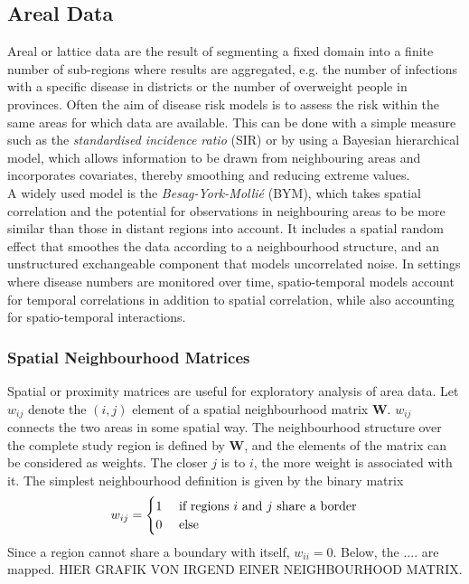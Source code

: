 \documentclass[12pt]{book}
\begin{document}
\subsection{Areal Data}
Areal or lattice data are the result of segmenting a fixed domain into a finite number of sub-regions where results are aggregated, e.g. the number of infections with a specific disease in districts or the number of overweight people in provinces. Often the aim of disease risk models is to assess the risk within the same areas for which data are available. This can be done with a simple measure such as the \textit{standardised incidence ratio} (SIR) or by using a Bayesian hierarchical model, which allows information to be drawn from neighbouring areas and incorporates covariates, thereby smoothing and reducing extreme values. \\
A widely used model is the \textit{Besag-York-Mollié} (BYM), which takes spatial correlation and the potential for observations in neighbouring areas to be more similar than those in distant regions into account. It includes a spatial random effect that smoothes the data according to a neighbourhood structure, and an unstructured exchangeable component that models uncorrelated noise. In settings where disease numbers are monitored over time, spatio-temporal models account for temporal correlations in addition to spatial correlation, while also accounting for spatio-temporal interactions.
\subsubsection{Spatial Neighbourhood Matrices}
Spatial or proximity matrices are useful for exploratory analysis of area data. Let $w_{ij}$ denote the $\left(i,j\right)$ element of a spatial neighbourhood matrix $\pmb{W}$. $w_{ij}$ connects the two areas in some spatial way. The neighbourhood structure over the complete study region is defined by $\pmb{W}$, and the elements of the matrix can be considered as weights. The closer $j$ is to $i$, the more weight is associated with it. The simplest neighbourhood definition is given by the binary matrix
\begin{equation}
    w_{ij}=\begin{cases}
    1 & \hbox{ if regions } i $\hbox{ and }$ j \hbox{ share a border} \\
    0 & \hbox{ else }
    \end{cases}
\end{equation}
Since a region cannot share a boundary with itself, $w_{ii}=0$.  Below, the .... are mapped.
HIER GRAFIK VON IRGEND EINER NEIGHBOURHOOD MATRIX.
\end{document}
